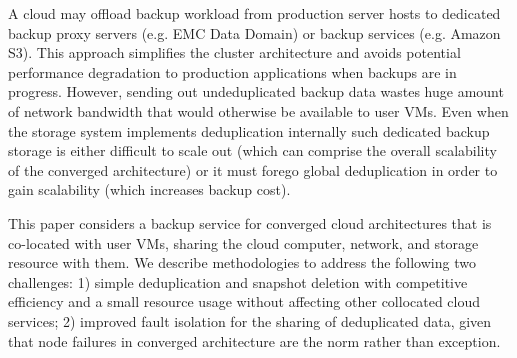 A cloud may offload backup workload from production 
server hosts to dedicated backup proxy servers (e.g. EMC Data Domain) or
backup services (e.g. Amazon S3). This approach simplifies the cluster 
architecture and 
avoids potential performance degradation to production applications when 
backups are in progress.
However, sending out undeduplicated backup data wastes huge amount
of network bandwidth that would otherwise be available to user VMs. 
Even when the storage system implements deduplication internally
such dedicated backup storage is either difficult to scale out
(which can comprise the overall scalability of the converged architecture) 
or it must forego global deduplication in order to gain scalability 
(which increases backup cost).

This paper considers a backup service for converged cloud architectures
that is co-located with user VMs, sharing the cloud computer, network, and
storage resource with them.
We describe methodologies to address the following two challenges: 
1) simple deduplication and snapshot deletion with competitive efficiency and 
a small resource usage without affecting other collocated cloud services;
2) improved fault isolation for the sharing of deduplicated data,
given that node failures in converged architecture are the norm rather than
exception. 


 

